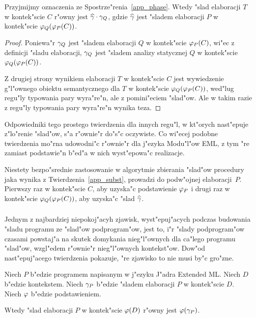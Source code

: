 \begin{thm}
\label{app_subst}
Przyjmijmy oznaczenia ze Spostrze"renia~\ref{app_phase}.
Wtedy "slad elaboracji $T$ w kontek"scie $C$ r"owny jest $\widehat{\gamma}\cdot \gamma_Q$,
gdzie $\widehat{\gamma}$ jest "sladem elaboracji $P$ w kontek"scie $\varphi_Q(\varphi_P(C))$.
\end{thm}

\begin{proof}
Poniewa"r $\gamma_Q$ jest "sladem elaboracji
$Q$ w kontek"scie $\varphi_P(C)$, wi"ec z definicji "sladu elaboracji,
$\gamma_Q$ jest "sladem analizy statycznej $Q$ w kontek"scie $\varphi_Q(\varphi_P(C))$.

Z drugiej strony wynikiem elaboracji $T$ w kontek"scie $C$ 
jest wywiedzenie g"l"ownego obiektu semantycznego
dla $T$ w kontek"scie $\varphi_Q(\varphi_P(C))$, 
wed"lug regu"ly typowania pary wyra"re"n, ale z pomini"eciem "slad"ow.
Ale w takim razie z regu"ly typowania pary wyra"re"n wynika teza.
\end{proof}

Odpowiedniki tego prostego twierdzenia dla innych regu"l, 
w kt"orych na\-st"e\-pu\-je z"lo"renie "slad"ow, s"a r"ownie"r do"s"c oczywiste.
Co wi"ecej podobne twierdzenia mo"rna udowodni"c r"ownie"r dla j"ezyka Modu"l"ow EML,
z tym "re zamiast podstawie"n b"ed"a w nich wyst"epowa"c realizacje.

Niestety bezpo"srednie zastosowanie w algorytmie zbierania "slad"ow
procedury jaka wynika z Twierdzenia~\ref{app_subst},
prowadzi do podw"ojnej elaboracji~$P$. Pierwszy raz w kontek"scie $C$, 
aby uzyska"c podstawienie $\varphi_P$ i drugi raz w kontek"scie $\varphi_Q(\varphi_P(C))$,
aby uzyska"c "slad $\widehat{\gamma}$.

\subsubsection{\secscheme}
\label{sec:scheme}

Jednym z najbardziej niepokoj"acyh zjawisk, wyst"epuj"acych
podczas budowania "sladu programu ze "slad"ow podprogram"ow, jest to, 
i"r "slady podprogram"ow czasami powstaj"a na skutek domykania
nieg"l"ownych dla ca"lego programu "slad"ow, wzgl"edem r"ownie"r nieg"l"ownych kontekst"ow.
Dow"od na\-st"e\-pu\-j"a\-ce\-go twierdzenia pokazuje, 
"re zjawisko to nie musi by"c gro"zne.
\begin{thm}
\label{rea_clos}
Niech $P$ b"edzie programem napisanym w j"ezyku J"adra Extended ML.
Niech $D$ b"edzie kontekstem.
Niech $\gamma_P$ b"edzie "sladem elaboracji $P$ w kontek"scie $D$.
Niech $\varphi$ b"edzie podstawieniem.

Wtedy "slad elaboracji $P$ w kontek"scie $\varphi(D)$ r"owny jest $\varphi(\gamma_P)$.
\end{thm}
 
